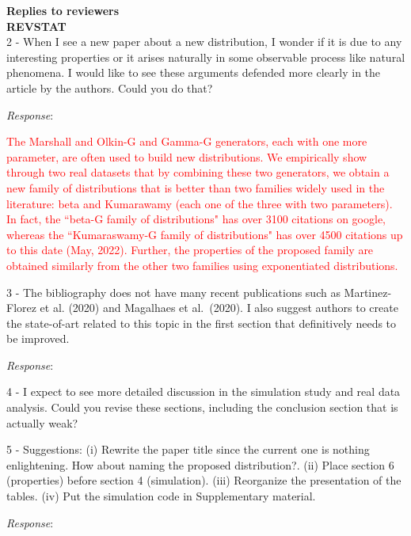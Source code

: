 \documentclass[version=last,12pt,{"maintainersDelight"},letterpaper,]{scrlttr2}
\begin{document}
\begin{letter}{\textbf{Replies to reviewers}\\\textbf{REVSTAT}\\}
2 - When I see a new paper about a new distribution, I wonder if it is due to any interesting properties or it arises naturally in some
observable process like natural phenomena. I would like to see these
arguments defended more clearly in the article by the authors. Could you do that?



\emph{Response}:

\textcolor{red}{The Marshall and Olkin-G and Gamma-G generators, each with one more parameter, are often used to build new distributions. We empirically show through two real datasets that by combining these two generators, we obtain a new family of distributions that is better than two families widely used in the literature: beta and Kumarawamy (each one of the three with two parameters). In fact, the ``beta-G family of distributions" has over 3100 citations on google, whereas the ``Kumaraswamy-G family of distributions" has over 4500 citations  up to this date (May, 2022). Further, the properties of the proposed family are obtained similarly from the other two families using exponentiated distributions.} 

3 - The bibliography does not have many recent publications such as
Martinez-Florez et al. (2020) and Magalhaes et al.~(2020). I also
suggest authors to create the state-of-art related to this topic in the first section that definitively needs to be improved.

\emph{Response}:

4 - I expect to see more detailed discussion in the simulation study and real data analysis. Could you revise these sections, including the conclusion section that is actually weak?

5 - Suggestions: (i) Rewrite the paper title since the current one is nothing enlightening. How about naming the proposed distribution?. (ii) Place section 6 (properties) before section 4 (simulation). (iii) Reorganize the presentation of the tables. (iv) Put the simulation code in Supplementary material.

\emph{Response}:


\end{letter}
\end{document}
